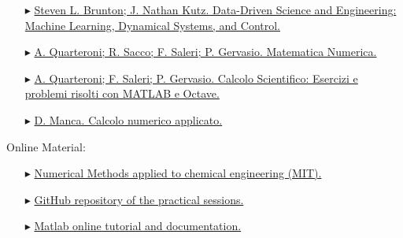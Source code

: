 \documentclass[xcolor={dvipsnames,rgb}, aspectratio=169]{beamer}
\begin{document}
\begin{frame}{}
    \begin{itemize}
        \item[$\blacktriangleright$]
              \href{https://www.amazon.it/Data-Driven-Science-Engineering-Learning-Dynamical/dp/1009098489/ref=asc_df_1009098489/?tag=googshopit-21&linkCode=df0&hvadid=560287860614&hvpos=&hvnetw=g&hvrand=14266207767663986773&hvpone=&hvptwo=&hvqmt=&hvdev=c&hvdvcmdl=&hvlocint=&hvlocphy=1008463&hvtargid=pla-1599460130783&psc=1}{\footnotesize
                  Steven L. Brunton; J. Nathan Kutz. Data-Driven Science and Engineering: Machine
                  Learning, Dynamical Systems, and Control.}
        \item[$\blacktriangleright$]
              \href{https://link.springer.com/book/10.1007/978-88-470-5644-2}{\footnotesize A.
                  Quarteroni; R. Sacco; F. Saleri; P. Gervasio. Matematica Numerica.}
        \item[$\blacktriangleright$]
              \href{https://www.amazon.it/Calcolo-Scientifico-Esercizi-problemi-risolti-dp-8847039525/dp/8847039525/ref=dp_ob_title_bk}{\footnotesize
                  A. Quarteroni; F. Saleri; P. Gervasio. Calcolo Scientifico: Esercizi e problemi
                  risolti con MATLAB e Octave.}
        \item[$\blacktriangleright$]
              \href{https://www.ibs.it/calcolo-numerico-applicato-libro-davide-manca/e/9788837116972}{\footnotesize
                  D. Manca. Calcolo numerico applicato.}
    \end{itemize}
    \small \alert{Online Material}:
    \begin{itemize}
        \item[$\blacktriangleright$]
              \href{https://ocw.mit.edu/courses/10-34-numerical-methods-applied-to-chemical-engineering-fall-2015/pages/syllabus/}{\footnotesize
                  Numerical Methods applied to chemical engineering (MIT).}
        \item[$\blacktriangleright$]
              \href{https://github.com/Titodinelli/Calcoli-di-Processo-dell-Ingegneria-Chimica}{\footnotesize
                  GitHub repository of the practical sessions.}
        \item[$\blacktriangleright$]
              \href{https://it.mathworks.com/help/matlab/getting-started-with-matlab.html}{\footnotesize
                  Matlab online tutorial and documentation.}
    \end{itemize}
\end{frame}
\end{document}

